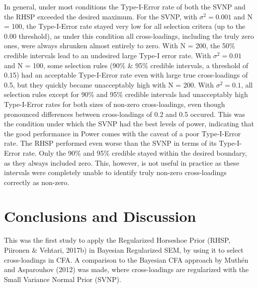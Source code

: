 \documentclass[
  man, donotrepeattitle,floatsintext]{apa6}
\begin{document}
In general, under most conditions the Type-I-Error rate of both the SVNP and the RHSP exceeded the desired maximum. For the SVNP, with \(\sigma^2 = 0.001\) and N = 100, the Type-I-Error rate stayed very low for all selection critera (up to the 0.00 threshold), as under this condition all cross-loadings, including the truly zero ones, were always shrunken almost entirely to zero. With N = 200, the 50\% credible intervals lead to an undesired large Type-I error rate. With \(\sigma^2 = 0.01\) and N = 100, some selection rules (90\% \& 95\% credible intervals, a threshold of 0.15) had an acceptable Type-I-Error rate even with large true cross-loadings of 0.5, but they quickly became unacceptably high with N = 200. With \(\sigma^2 = 0.1\), all selection rules except for 90\% and 95\% credible intervals had unacceptably high Type-I-Error rates for both sizes of non-zero cross-loadings, even though pronounced differences between cross-loadings of 0.2 and 0.5 occured. This was the condition under which the SVNP had the best levels of power, indicating that the good performance in Power comes with the caveat of a poor Type-I-Error rate. The RHSP performed even worse than the SVNP in terms of its Type-I-Error rate. Only the 90\% and 95\% credible stayed within the desired boundary, as they always included zero. This, however, is not useful in practice as these intervals were completely unable to identify truly non-zero cross-loadings correctly as non-zero.

\hypertarget{conclusions-and-discussion}{%
\section{Conclusions and Discussion}\label{conclusions-and-discussion}}

This was the first study to apply the Regularized Horseshoe Prior (RHSP, Piironen \& Vehtari, 2017b) in Bayesian Regularized SEM, by using it to select cross-loadings in CFA. A comparison to the Bayesian CFA approach by Muthén and Asparouhov (2012) was made, where cross-loadings are regularized with the Small Variance Normal Prior (SVNP).
\end{document}
